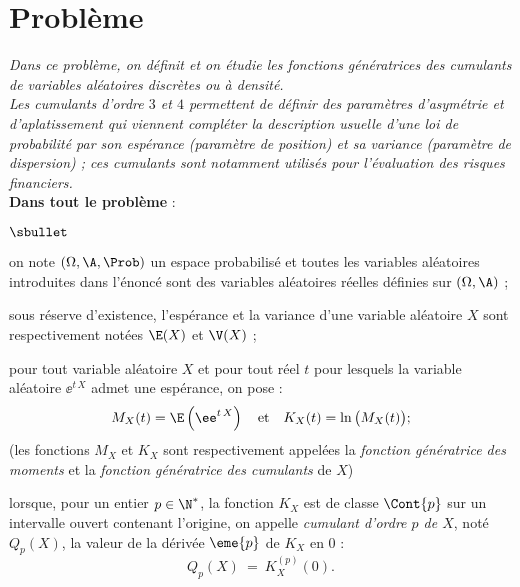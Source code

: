 \documentclass[11pt]{article}%
\begin{document}
\newpage


\section*{Problème}

\noindent %
{\it Dans ce problème, on définit et on étudie les fonctions
  génératrices des cumulants de variables aléatoires discrètes ou à
  densité.\\
  Les cumulants d'ordre $3$ et $4$ permettent de définir des
  paramètres d'asymétrie et d'aplatissement qui viennent compléter la
  description usuelle d'une loi de probabilité par son espérance
  (paramètre de position) et sa variance (paramètre de dispersion) ;
  ces cumulants sont notamment utilisés pour l'évaluation des risques
  financiers.}\\[.2cm]
{\bf Dans tout le problème} :
\begin{noliste}{$\sbullet$}
\item on note $(\Omega, \A, \Prob)$ un espace probabilisé et toutes
  les variables aléatoires introduites dans l'énoncé sont des
  variables aléatoires réelles définies sur $(\Omega, \A)$ ;
  
\item sous réserve d'existence, l'espérance et la variance d'une
  variable aléatoire $X$ sont respectivement notées $\E(X)$ et $\V(X)$
  ;
  
\item pour tout variable aléatoire $X$ et pour tout réel $t$ pour
  lesquels la variable aléatoire $\ee^{t \, X}$ admet une espérance,
  on pose :
  \[
    M_X(t) = \E\left(\ee^{t \, X}\right) \quad \text{et} \quad K_X(t)
    = \ln\big(M_X(t)\big) ;
  \]
  (les fonctions $M_X$ et $K_X$ sont respectivement appelées la {\it
    fonction génératrice des moments} et la {\it fonction génératrice
    des cumulants} de $X$)
  
\item lorsque, pour un entier $p \in \N^*$, la fonction $K_X$ est de
  classe $\Cont{p}$ sur un intervalle ouvert contenant l'origine, on
  appelle {\it cumulant d'ordre $p$ de $X$}, noté $Q_p(X)$, la valeur
  de la dérivée $\eme{p}$ de $K_X$ en $0$ :
  \[
    Q_p(X) \ = \ K_X^{(p)}(0).
  \]
\end{noliste}
\end{document}
